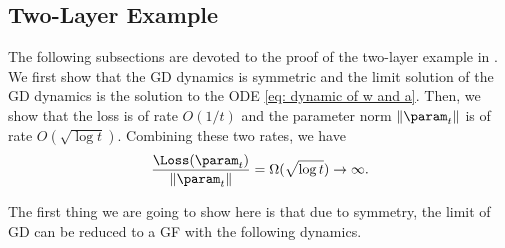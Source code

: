 \subsection{Two-Layer Example}
The following subsections are devoted to the proof of the two-layer example in . We first show that the GD dynamics is symmetric and the limit solution of the GD dynamics is the solution to the ODE \eqref{eq: dynamic of w and a}. Then, we show that the loss is of rate $O(1/t)$ and the parameter norm $\|\param_t\|$ is of rate $O(\sqrt{\log t})$. Combining these two rates, we have 
\[
\frac{\Loss(\param_t)}{\|\param_t\|} = \Omega(\sqrt{\log t}) \to  \infty.  
\]

The first thing we are going to show here is that due to symmetry, the limit of GD can be reduced to a GF with the following dynamics. 

